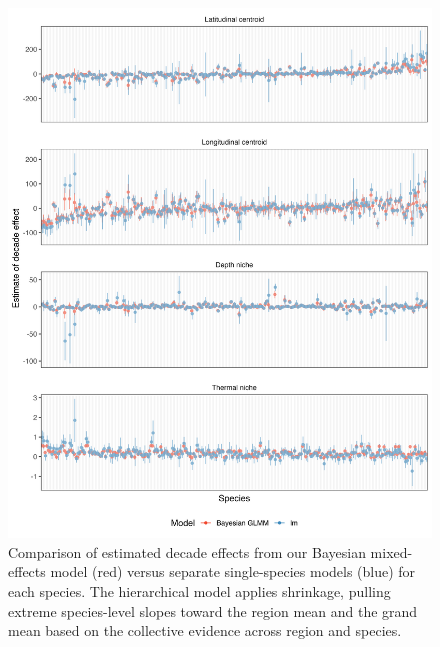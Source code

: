 \documentclass[11pt]{article}
\begin{document}
\begin{figure}[h]
    \centering
        \includegraphics[scale=0.7]{images/shrinkage_slopes.png}
    \caption{Comparison of estimated decade effects from our Bayesian mixed-effects model (red) versus separate single-species models (blue) for each species. The hierarchical model applies shrinkage, pulling extreme species-level slopes toward the region mean and the grand mean based on the collective evidence across region and species.
}
    \label{fig:shrinkage}
\end{figure}

\newpage
\end{document}
